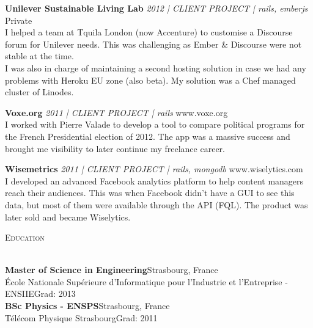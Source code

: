 \documentclass[a4paper]{article}
\newcommand{\lineunder} {
    \vspace*{-8pt} \\
    \hspace*{-18pt} \hrulefill \\
}
\newcommand{\header} [1] {
    {\hspace*{-18pt}\vspace*{6pt} \textsc{#1}}
    \vspace*{-6pt} \lineunder
}
\begin{document}
{\textbf{Unilever Sustainable Living Lab} \sl 2012 | CLIENT PROJECT | rails, emberjs} \hfill Private\\
I helped a team at Tquila London (now Accenture) to customise a Discourse forum for Unilever needs.
This was challenging as Ember \& Discourse were not stable at the time. \\
I was also in charge of maintaining a second hosting solution in case we had any problems with Heroku EU zone (also beta).
My solution was a Chef managed cluster of Linodes.\\
\vspace*{2mm}


{\textbf{Voxe.org} \sl 2011 | CLIENT PROJECT | rails} \hfill www.voxe.org\\
I worked with Pierre Valade to develop a tool to compare political programs for the French Presidential election of 2012.
The app was a massive success and brought me visibility to later continue my freelance career.\\
\vspace*{2mm}

{\textbf{Wisemetrics} \sl 2011 | CLIENT PROJECT | rails, mongodb} \hfill www.wiselytics.com\\
I developed an advanced Facebook analytics platform to help content managers reach their audiences.
This was when Facebook didn't have a GUI to see this data, but most of them were available through the API (FQL).
The product was later sold and became Wiselytics.\\
\vspace*{2mm}

\header{Education}
\vspace{1mm}

\textbf{Master of Science in Engineering}\hfill Strasbourg, France\\
École Nationale Supérieure d'Informatique pour l'Industrie et l'Entreprise - ENSIIE\hfill Grad: 2013\\
\vspace{2mm}
\textbf{BSc Physics - ENSPS}\hfill Strasbourg, France\\
Télécom Physique Strasbourg\hfill Grad: 2011\\
\vspace{2mm}

\vspace*{2mm}

\ 
\end{document}
